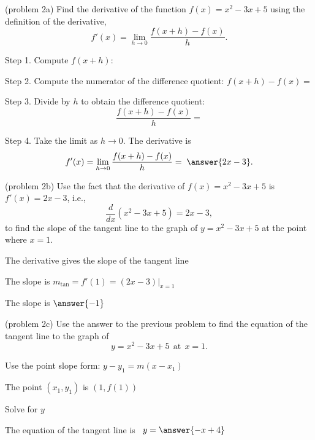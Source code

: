 \documentclass{ximera}
\begin{document}
\begin{problem}(problem 2a)
Find the derivative of the function $f(x) = x^2 - 3x + 5$ using the definition of the derivative,
\[
f'(x) = \lim_{h \to 0} \frac{f(x+h) - f(x)}{h}.
\]

Step 1. Compute $f(x + h)$:
\begin{multipleChoice}
\end{multipleChoice}


Step 2. Compute the numerator of the difference quotient: $f(x+h) - f(x) =$
\begin{multipleChoice}
\end{multipleChoice}


Step 3. Divide by $h$ to obtain the difference quotient:
\[
\frac{f(x+h) - f(x)}{h} = 
\]
\begin{multipleChoice}
\end{multipleChoice}

Step 4. Take the limit as $h \to 0$. The derivative is
\[
f'(x) = \lim_{h \to 0} \frac{f(x+h) - f(x)}{h} = \; \answer{2x-3}.
\]
\end{problem} 


\begin{problem}(problem 2b)
Use the fact that the derivative of $f(x) = x^2 -3x + 5$ is $f'(x) = 2x-3$,
i.e., 
\[
\frac{d}{dx}\left( x^2 - 3x + 5 \right) = 2x-3,
\]
to find the slope of the tangent line to the graph of 
$y = x^2 - 3x + 5$ at the point where $x = 1$.\\
\begin{hint}
The derivative gives the slope of the tangent line
\end{hint}
\begin{hint}
The slope is $m_{\text{tan}} = f'(1) = (2x-3)\big|_{x=1}$
\end{hint}
The slope is $\answer{-1}$
\end{problem}

\begin{problem}(problem 2c)
Use the answer to the previous problem to find the equation of the tangent line to the graph of 
\[
y = x^2 - 3x + 5 \ \ \text{at} \ \ x=1.
\]
\begin{hint}
Use the point slope form: $y-y_1 = m(x-x_1)$
\end{hint}
\begin{hint}
The point $(x_1,y_1)$ is $(1, f(1))$
\end{hint}
\begin{hint}
Solve for $y$
\end{hint}
The equation of the tangent line is \ $y = \answer{-x+4}$
\end{problem}
\end{document}
